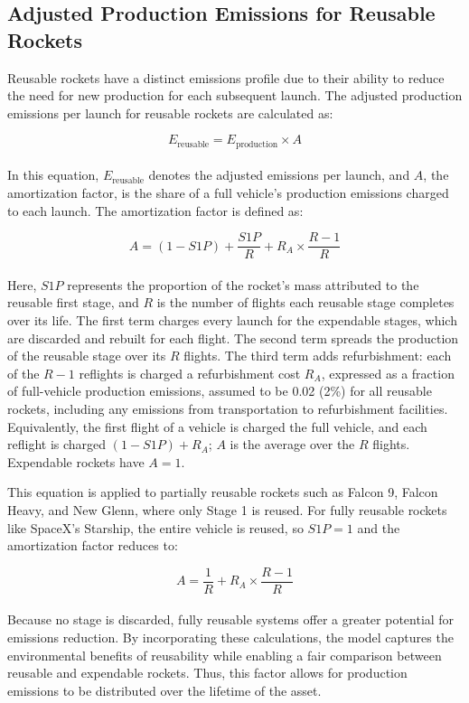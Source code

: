 \documentclass[pdflatex,sn-mathphys-num]{sn-jnl}
\theoremstyle{thmstyleone}%
\theoremstyle{thmstyletwo}%
\theoremstyle{thmstylethree}%
\begin{document}
\subsection{Adjusted Production Emissions for Reusable Rockets}\label{sec:reuse}

Reusable rockets have a distinct emissions profile due to their ability to reduce the need for new production for each subsequent launch. The adjusted production emissions per launch for reusable rockets are calculated as:

\begin{equation}
E_{\text{reusable}} = E_{\text{production}} \times A
\end{equation}
\\
In this equation, \( E_{\text{reusable}} \) denotes the adjusted emissions per launch, and \( A \), the amortization factor, is the share of a full vehicle's production emissions charged to each launch. The amortization factor is defined as:

\begin{equation}
A = \left( 1 - S1P \right) + \frac{S1P}{R} + R_A \times \frac{R - 1}{R}
\end{equation}
\\
Here, \( S1P \) represents the proportion of the rocket's mass attributed to the reusable first stage, and \( R \) is the number of flights each reusable stage completes over its life. The first term charges every launch for the expendable stages, which are discarded and rebuilt for each flight. The second term spreads the production of the reusable stage over its \( R \) flights. The third term adds refurbishment: each of the \( R - 1 \) reflights is charged a refurbishment cost \( R_A \), expressed as a fraction of full-vehicle production emissions, assumed to be 0.02 (2\%) for all reusable rockets, including any emissions from transportation to refurbishment facilities. Equivalently, the first flight of a vehicle is charged the full vehicle, and each reflight is charged \( (1 - S1P) + R_A \); \( A \) is the average over the \( R \) flights. Expendable rockets have \( A = 1 \).

This equation is applied to partially reusable rockets such as Falcon 9, Falcon Heavy, and New Glenn, where only Stage 1 is reused. For fully reusable rockets like SpaceX's Starship, the entire vehicle is reused, so \( S1P = 1 \) and the amortization factor reduces to:

\begin{equation}
A = \frac{1}{R} + R_A \times \frac{R - 1}{R}
\end{equation}
\\
Because no stage is discarded, fully reusable systems offer a greater potential for emissions reduction. By incorporating these calculations, the model captures the environmental benefits of reusability while enabling a fair comparison between reusable and expendable rockets. Thus, this factor allows for production emissions to be distributed over the lifetime of the asset.
\end{document}
